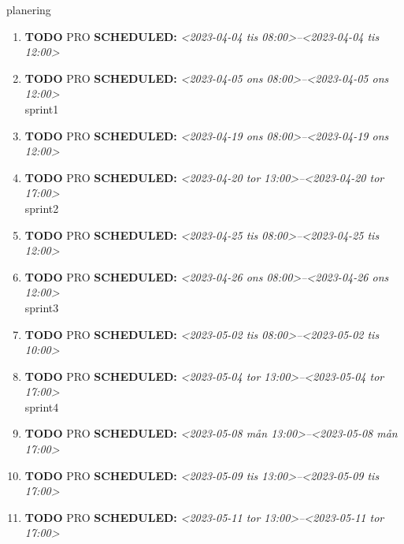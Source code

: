 \documentclass[11pt]{article}
\begin{document}
planering
\begin{enumerate}
\item {\bfseries\sffamily TODO} PRO
\label{sec:org4633fd4}
\noindent\textbf{SCHEDULED:} \textit{<2023-04-04 tis 08:00>--<2023-04-04 tis 12:00>}\\[0pt]
\item {\bfseries\sffamily TODO} PRO
\label{sec:orgbaf0e37}
\noindent\textbf{SCHEDULED:} \textit{<2023-04-05 ons 08:00>--<2023-04-05 ons 12:00>}\\[0pt]

sprint1
\item {\bfseries\sffamily TODO} PRO
\label{sec:orgdba57b7}
\noindent\textbf{SCHEDULED:} \textit{<2023-04-19 ons 08:00>--<2023-04-19 ons 12:00>}\\[0pt]
\item {\bfseries\sffamily TODO} PRO
\label{sec:org21ba1ef}
\noindent\textbf{SCHEDULED:} \textit{<2023-04-20 tor 13:00>--<2023-04-20 tor 17:00>}\\[0pt]

sprint2
\item {\bfseries\sffamily TODO} PRO
\label{sec:org748169f}
\noindent\textbf{SCHEDULED:} \textit{<2023-04-25 tis 08:00>--<2023-04-25 tis 12:00>}\\[0pt]
\item {\bfseries\sffamily TODO} PRO
\label{sec:org760d02b}
\noindent\textbf{SCHEDULED:} \textit{<2023-04-26 ons 08:00>--<2023-04-26 ons 12:00>}\\[0pt]

sprint3
\item {\bfseries\sffamily TODO} PRO
\label{sec:orgecf4a9d}
\noindent\textbf{SCHEDULED:} \textit{<2023-05-02 tis 08:00>--<2023-05-02 tis 10:00>}\\[0pt]
\item {\bfseries\sffamily TODO} PRO
\label{sec:org6cd90a6}
\noindent\textbf{SCHEDULED:} \textit{<2023-05-04 tor 13:00>--<2023-05-04 tor 17:00>}\\[0pt]

sprint4
\item {\bfseries\sffamily TODO} PRO
\label{sec:org1aed495}
\noindent\textbf{SCHEDULED:} \textit{<2023-05-08 mån 13:00>--<2023-05-08 mån 17:00>}\\[0pt]
\item {\bfseries\sffamily TODO} PRO
\label{sec:org03937eb}
\noindent\textbf{SCHEDULED:} \textit{<2023-05-09 tis 13:00>--<2023-05-09 tis 17:00>}\\[0pt]
\item {\bfseries\sffamily TODO} PRO
\label{sec:orge10dc0e}
\noindent\textbf{SCHEDULED:} \textit{<2023-05-11 tor 13:00>--<2023-05-11 tor 17:00>}\\[0pt]
\end{enumerate}
\end{document}
